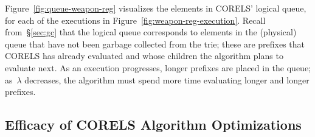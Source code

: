 \documentclass[twoside,11pt]{article}
\def\Reg{{\lambda}}
\begin{document}
Figure~\ref{fig:queue-weapon-reg} visualizes the elements in CORELS' logical queue,
for each of the executions in Figure~\ref{fig:weapon-reg-execution}.
%
Recall from~\S\ref{sec:gc} that the logical queue corresponds to elements in the
(physical) queue that have not been garbage collected from the trie; these are prefixes that
CORELS has already evaluated and whose children the algorithm plans to evaluate next.
%
As an execution progresses, longer prefixes are placed in the queue;
as~$\Reg$ decreases, the algorithm must spend more time evaluating longer and longer prefixes.

\subsection{Efficacy of CORELS Algorithm Optimizations}
\label{sec:ablation}
\end{document}
